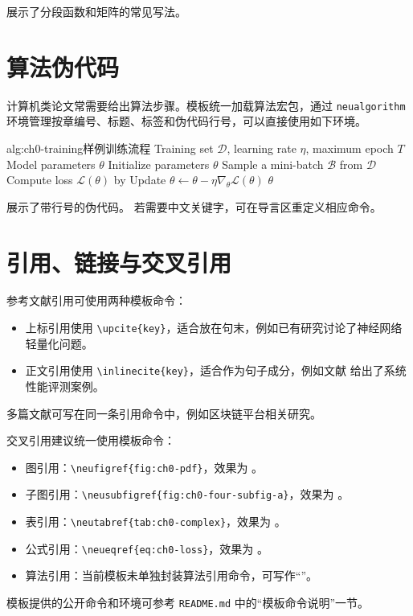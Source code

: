  展示了分段函数和矩阵的常见写法。

\section{算法伪代码}

计算机类论文常需要给出算法步骤。模板统一加载算法宏包，通过 \texttt{neualgorithm} 环境管理按章编号、标题、标签和伪代码行号，可以直接使用如下环境。

\begin{neualgorithm}[!htbp]{alg:ch0-training}{样例训练流程}
    \REQUIRE Training set $\mathcal{D}$, learning rate $\eta$, maximum epoch $T$
    \ENSURE Model parameters $\theta$
    \STATE Initialize parameters $\theta$
    \STATE Sample a mini-batch $\mathcal{B}$ from $\mathcal{D}$
    \STATE Compute loss $\mathcal{L}(\theta)$ by 
    \STATE Update $\theta \leftarrow \theta - \eta \nabla_{\theta}\mathcal{L}(\theta)$
    \ENDFOR
    \RETURN $\theta$
\end{neualgorithm}

 展示了带行号的伪代码。
若需要中文关键字，可在导言区重定义相应命令。

\section{引用、链接与交叉引用}

参考文献引用可使用两种模板命令：
\begin{itemize}
  \item 上标引用使用 \verb|\upcite{key}|，适合放在句末，例如已有研究讨论了神经网络轻量化问题。
  \item 正文引用使用 \verb|\inlinecite{key}|，适合作为句子成分，例如文献  给出了系统性能评测案例。
\end{itemize}
多篇文献可写在同一条引用命令中，例如区块链平台相关研究。

交叉引用建议统一使用模板命令：
\begin{itemize}
  \item 图引用：\verb|\neufigref{fig:ch0-pdf}|，效果为 。
  \item 子图引用：\verb|\neusubfigref{fig:ch0-four-subfig-a}|，效果为 。
  \item 表引用：\verb|\neutabref{tab:ch0-complex}|，效果为 。
  \item 公式引用：\verb|\neueqref{eq:ch0-loss}|，效果为 。
  \item 算法引用：当前模板未单独封装算法引用命令，可写作“”。
\end{itemize}
模板提供的公开命令和环境可参考 \texttt{README.md} 中的“模板命令说明”一节。
